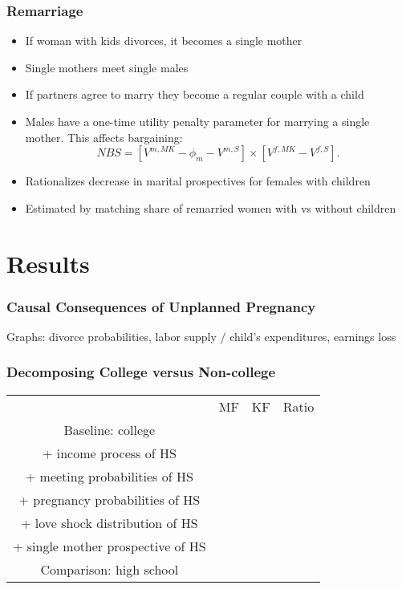 \documentclass{beamer}
\begin{document}
\begin{frame}
\frametitle{Remarriage}
\begin{itemize}
\item If woman with kids divorces, it becomes a single mother
\item Single mothers meet single males
\item If partners agree to marry they become a regular couple with a child
\item Males have a one-time utility penalty parameter for marrying a single mother. This affects bargaining:
\[NBS = \left[ V^{m,MK} - \phi_m - V^{m,S}\right] \times  \left[ V^{f,MK} - V^{f,S}\right].\]
\item Rationalizes decrease in marital prospectives for females with children
\item Estimated by matching share of remarried women with vs without children
\end{itemize}
\end{frame}

\section{Results}


\begin{frame}
\frametitle{Causal Consequences of Unplanned Pregnancy}
Graphs: divorce probabilities, labor supply / child's expenditures, earnings loss
\end{frame}

\begin{frame}
\frametitle{Decomposing College versus Non-college}
\begin{center}
\begin{tabular}{|c|c|c|c|}
& MF & KF & Ratio \\
Baseline: college & \\
+ income process of HS & \\
+ meeting probabilities of HS & \\
+ pregnancy probabilities of HS & \\
+ love shock distribution of HS & \\
+ single mother prospective of HS & \\
Comparison: high school & \\
\end{tabular}
\end{center}
\end{frame}
\end{document}
